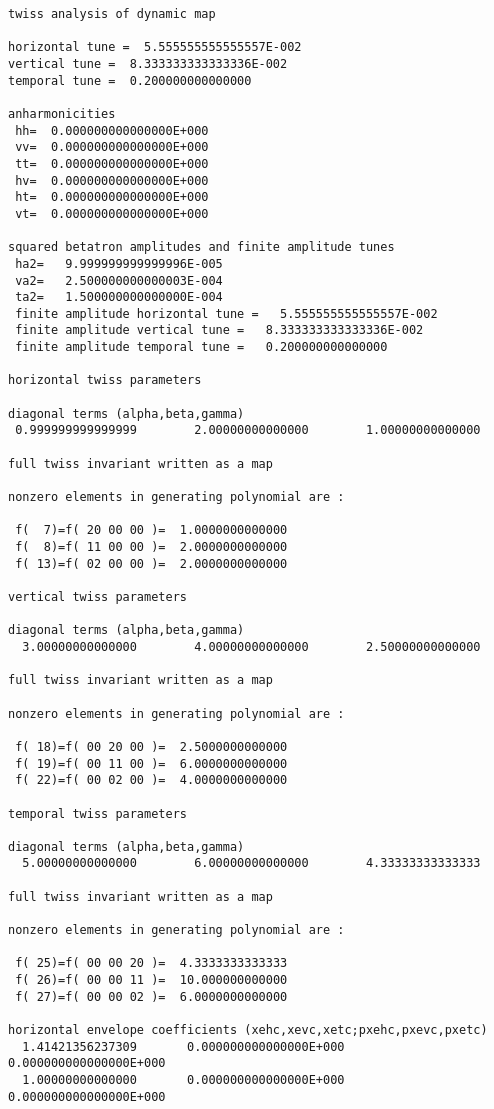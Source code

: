 \begin{footnotesize}
\begin{verbatim}
twiss analysis of dynamic map

horizontal tune =  5.555555555555557E-002
vertical tune =  8.333333333333336E-002
temporal tune =  0.200000000000000

anharmonicities
 hh=  0.000000000000000E+000
 vv=  0.000000000000000E+000
 tt=  0.000000000000000E+000
 hv=  0.000000000000000E+000
 ht=  0.000000000000000E+000
 vt=  0.000000000000000E+000

squared betatron amplitudes and finite amplitude tunes
 ha2=   9.999999999999996E-005
 va2=   2.500000000000003E-004
 ta2=   1.500000000000000E-004
 finite amplitude horizontal tune =   5.555555555555557E-002
 finite amplitude vertical tune =   8.333333333333336E-002
 finite amplitude temporal tune =   0.200000000000000

horizontal twiss parameters

diagonal terms (alpha,beta,gamma)
 0.999999999999999        2.00000000000000        1.00000000000000

full twiss invariant written as a map

nonzero elements in generating polynomial are :

 f(  7)=f( 20 00 00 )=  1.0000000000000
 f(  8)=f( 11 00 00 )=  2.0000000000000
 f( 13)=f( 02 00 00 )=  2.0000000000000

vertical twiss parameters

diagonal terms (alpha,beta,gamma)
  3.00000000000000        4.00000000000000        2.50000000000000

full twiss invariant written as a map

nonzero elements in generating polynomial are :

 f( 18)=f( 00 20 00 )=  2.5000000000000
 f( 19)=f( 00 11 00 )=  6.0000000000000
 f( 22)=f( 00 02 00 )=  4.0000000000000

temporal twiss parameters

diagonal terms (alpha,beta,gamma)
  5.00000000000000        6.00000000000000        4.33333333333333

full twiss invariant written as a map

nonzero elements in generating polynomial are :

 f( 25)=f( 00 00 20 )=  4.3333333333333
 f( 26)=f( 00 00 11 )=  10.000000000000
 f( 27)=f( 00 00 02 )=  6.0000000000000

horizontal envelope coefficients (xehc,xevc,xetc;pxehc,pxevc,pxetc)
  1.41421356237309       0.000000000000000E+000  0.000000000000000E+000
  1.00000000000000       0.000000000000000E+000  0.000000000000000E+000


\end{verbatim}
\end{footnotesize}
